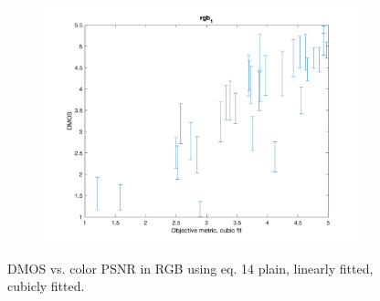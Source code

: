 \documentclass{article}
\begin{document}
\begin{figure}
   \begin{subfigure}[b]{0.65\textwidth}
   \includegraphics[width=\textwidth]{Figures/task3/rgb1_cubic.png}
   \end{subfigure}
    \label{fig:rgb1_fitted}
     \caption{DMOS vs. color PSNR in RGB using eq. 14 plain, linearly fitted, cubicly fitted.}
\end{figure}
\end{document}
